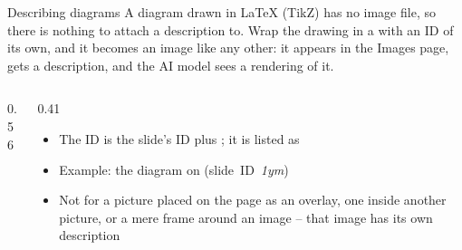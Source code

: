 
\begin{standardframe}{Describing diagrams}
	\small
	A diagram drawn in LaTeX (TikZ) has no image file, so there is nothing to
	attach a description to. Wrap the drawing in a 
	with an ID of its own, and it becomes an image like any other: it appears in
	the Images page, gets a description, and the AI model sees a rendering of it.
	\par
	\begin{columns}[T,onlytextwidth]
		\begin{column}{0.56\linewidth}
		\end{column}
		\begin{column}{0.41\linewidth}
			\begin{itemize}
				\item The ID is the slide's ID plus ; it is listed as 
				\item Example: the diagram on  \mbox{(slide ID \emph{1ym})}
				\item Not for a picture placed on the page as an overlay, one inside another picture, or a mere frame around an image -- that image has its own description
			\end{itemize}
		\end{column}
	\end{columns}
\end{standardframe}
